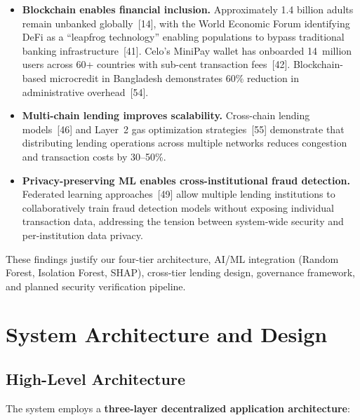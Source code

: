 \documentclass[12pt,a4paper]{report}
\begin{document}
\begin{itemize}[noitemsep]
\item \textbf{Blockchain enables financial inclusion.} Approximately 1.4 billion adults remain unbanked globally~[14], with the World Economic Forum identifying DeFi as a ``leapfrog technology'' enabling populations to bypass traditional banking infrastructure~[41]. Celo's MiniPay wallet has onboarded 14~million users across 60+ countries with sub-cent transaction fees~[42]. Blockchain-based microcredit in Bangladesh demonstrates 60\% reduction in administrative overhead~[54].
\item \textbf{Multi-chain lending improves scalability.} Cross-chain lending models~[46] and Layer~2 gas optimization strategies~[55] demonstrate that distributing lending operations across multiple networks reduces congestion and transaction costs by 30--50\%.
\item \textbf{Privacy-preserving ML enables cross-institutional fraud detection.} Federated learning approaches~[49] allow multiple lending institutions to collaboratively train fraud detection models without exposing individual transaction data, addressing the tension between system-wide security and per-institution data privacy.
\end{itemize}

These findings justify our four-tier architecture, AI/ML integration (Random Forest, Isolation Forest, SHAP), cross-tier lending design, governance framework, and planned security verification pipeline.


\chapter{System Architecture and Design}

\section{High-Level Architecture}

The system employs a \textbf{three-layer decentralized application architecture}:
\end{document}
